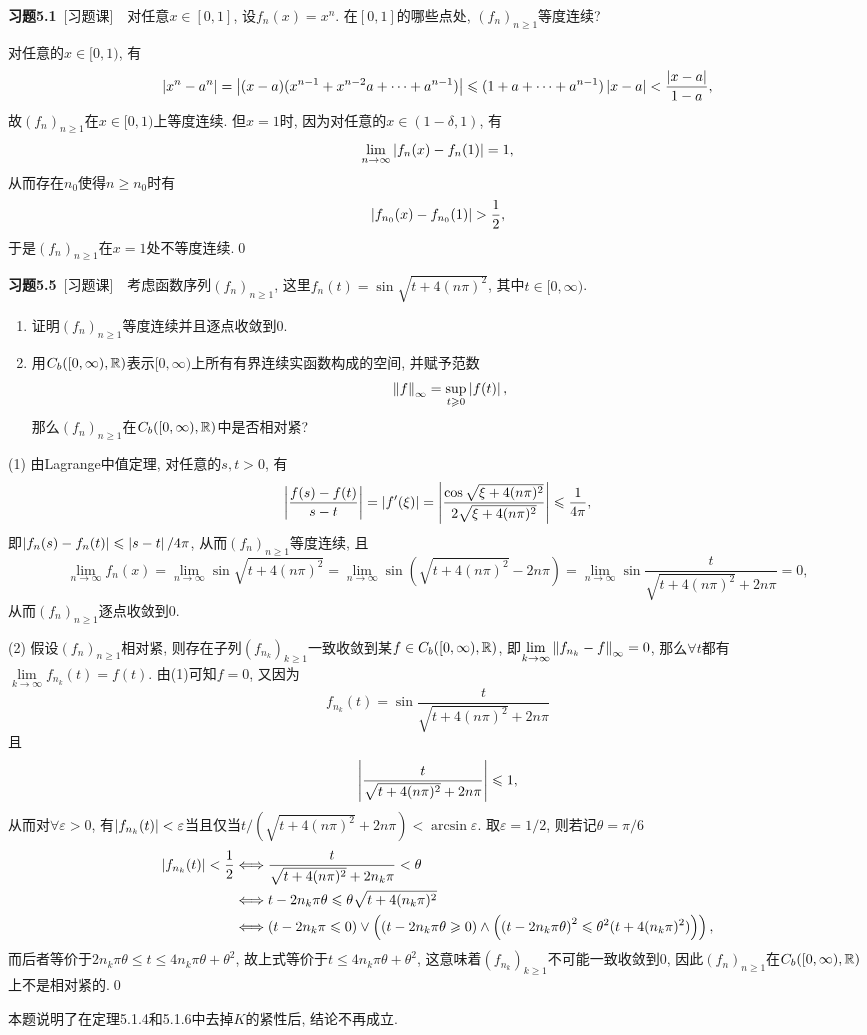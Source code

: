 	\textbf{习题5.1}\ [习题课]\ \ 对任意$ x\in[0,1] $, 设$ f_n(x)=x^n $. 在$ [0,1] $的哪些点处, $ (f_n)_{n\geqslant 1} $等度连续?
	\begin{Proof}
	对任意的$ x\in[0,1) $, 有
	\[
	\left| x^n-a^n \right| =\left| (x-a)(x^{n-1}+x^{n-2}a+\cdots+a^{n-1}) \right| \leqslant(1+a+\cdots+a^{n-1})\left| x-a \right| <\frac{\left| x-a \right| }{1-a},
	\]
	故$ (f_n)_{n\geqslant 1} $在$ x\in[0,1) $上等度连续. 但$ x=1 $时, 因为对任意的$ x\in(1-\delta,1) $, 有
	\[
	\lim_{n\to\infty}\left| f_n(x)-f_n(1) \right| =1,
	\]
	从而存在$ n_0 $使得$ n\geqslant n_0 $时有
	\[
	\left| f_{n_0}(x)-f_{n_0}(1) \right| >\frac{1}{2},
	\]
	于是$ (f_n)_{n\geqslant 1} $在$ x=1 $处不等度连续.\qed
	\end{Proof}
	
	\textbf{习题5.5}\ [习题课]\ \ 考虑函数序列$ (f_n)_{n\geqslant 1} $, 这里$ f_n(t)=\sin\sqrt{t+4(n\pi)^2} $, 其中$ t\in[0,\infty) $.
	\begin{enumerate}[(1)]
	\item 证明$ (f_n)_{n\geqslant 1} $等度连续并且逐点收敛到0.
	\item 用$ C_b([0,\infty),\mathbb{R}) $表示$ [0,\infty) $上所有有界连续实函数构成的空间, 并赋予范数
	\[
	\left\| f \right\|_\infty=\sup_{t\geqslant 0}\left| f(t) \right| ,
	\]
	那么$ (f_n)_{n\geqslant 1} $在$ C_b([0,\infty),\mathbb{R}) $中是否相对紧?
	\end{enumerate}
	\begin{Proof}
	(1) 由Lagrange中值定理, 对任意的$ s, t>0 $, 有
	\[
	\left| \frac{f(s)-f(t)}{s-t} \right| =\left| f'(\xi) \right| =\left| \frac{\cos\sqrt{\xi+4(n\pi)^2}}{2\sqrt{\xi+4(n\pi)^2}} \right| \leqslant\frac{1}{4\pi},
	\]
	即$ \left| f_n(s)-f_n(t) \right| \leqslant\left| s-t \right| /4\pi $, 从而$ (f_n)_{n\geqslant 1} $等度连续, 且
	\[
	\lim_{n\to\infty}f_n(x)=\lim_{n\to\infty}\sin\sqrt{t+4(n\pi)^2}=\lim_{n\to\infty}\sin(\sqrt{t+4(n\pi)^2}-2n\pi)=\lim_{n\to\infty}\sin\frac{t}{\sqrt{t+4(n\pi)^2}+2n\pi}=0,
	\]
	从而$ (f_n)_{n\geqslant 1} $逐点收敛到0.
	
	(2) 假设$ (f_n)_{n\geqslant 1} $相对紧, 则存在子列$ (f_{n_k})_{k\geqslant 1} $一致收敛到某$ f\in C_b([0,\infty),\mathbb{R}) $, 即$ \lim\limits_{k\to\infty}\left\| f_{n_k}-f \right\|_\infty=0 $, 那么$ \forall t $都有$ \lim\limits_{k\to\infty}f_{n_k}(t)=f(t) $. 由(1)可知$ f=0 $, 又因为
	\[
	f_{n_k}(t)=\sin\frac{t}{\sqrt{t+4(n\pi)^2}+2n\pi}
	\]
	且
	\[
	\left| \frac{t}{\sqrt{t+4(n\pi)^2}+2n\pi} \right| \leqslant 1,
	\]
	从而对$ \forall\varepsilon>0 $, 有$ \left| f_{n_k}(t) \right| <\varepsilon $当且仅当$ t/(\sqrt{t+4(n\pi)^2}+2n\pi)<\arcsin\varepsilon $. 取$ \varepsilon=1/2 $, 则若记$ \theta=\pi/6 $
	\[
	\begin{aligned}
	\left| f_{n_k}(t) \right| <\frac{1}{2} & \Longleftrightarrow \frac{t}{\sqrt{t+4(n\pi)^2}+2n_k\pi}<\theta \\
	& \Longleftrightarrow t-2n_k\pi\theta\leqslant\theta\sqrt{t+4(n_k\pi)^2} \\
	& \Longleftrightarrow (t-2n_k\pi\leqslant 0)\lor\left( \left( t-2n_k\pi\theta\geqslant 0 \right)\land\left( \left(t-2n_k\pi\theta\right)^2\leqslant\theta^2(t+4(n_k\pi)^2) \right) \right),
	\end{aligned}
	\]
	而后者等价于$ 2n_k\pi\theta\leqslant t\leqslant 4n_k\pi\theta+\theta^2 $, 故上式等价于$ t\leqslant 4n_k\pi\theta+\theta^2 $, 这意味着$ (f_{n_k})_{k\geqslant 1} $不可能一致收敛到0, 因此$ (f_n)_{n\geqslant 1} $在$ C_b([0,\infty),\mathbb{R}) $上不是相对紧的.\qed
	\end{Proof}
	\begin{Remark}
	本题说明了在定理5.1.4和5.1.6中去掉$ K $的紧性后, 结论不再成立.
	\end{Remark}